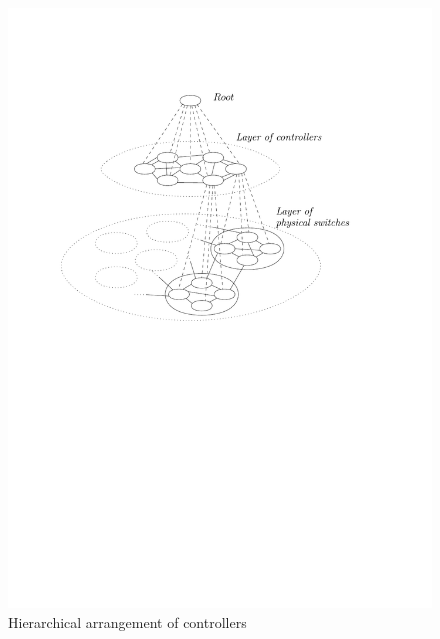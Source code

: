 \documentclass[a0,portrait]{a0poster}
\begin{document}
\begin{multicols}{2}
\begin{figure}[H]
\centering
\includegraphics[scale=2]{hierarchy}
\caption{Hierarchical arrangement of controllers}
\label{fig:hierarchy}
\end{figure}






\color{SaddleBrown}

\end{multicols}
\end{document}
